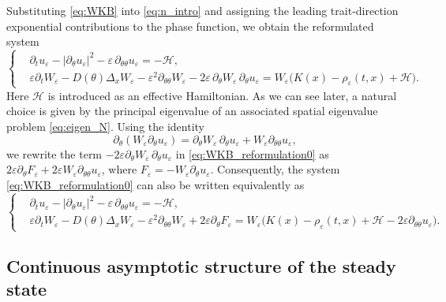 \documentclass[11pt]{article}
\begin{document}
Substituting \eqref{eq:WKB} into \eqref{eq:n_intro} and assigning the leading trait-direction exponential contributions to the phase function, we obtain the reformulated system
\begin{equation}\label{eq:WKB_reformulation0}
\left\{
\begin{aligned}
& \partial_t u_\varepsilon
- |\partial_\theta u_\varepsilon|^2
- \varepsilon \, \partial_{\theta\theta} u_\varepsilon
= - \mathcal H, \\
& \varepsilon \partial_t W_\varepsilon
- D(\theta)\Delta_x W_\varepsilon
- \varepsilon^2 \partial_{\theta\theta} W_\varepsilon
- 2\varepsilon \, \partial_\theta W_\varepsilon \, \partial_\theta u_\varepsilon
= W_\varepsilon\bigl(K(x)-\rho_\varepsilon(t,x)+\mathcal H \bigr). 
\end{aligned}
\right.
\end{equation}
Here \(\mathcal H\) is introduced as an effective Hamiltonian. 
As we can see later, a natural choice is given by the principal eigenvalue of an associated spatial eigenvalue problem \eqref{eq:eigen_N}. 
Using the identity
\[
\partial_\theta(W_\varepsilon\partial_\theta u_\varepsilon)
=
\partial_\theta W_\varepsilon\,\partial_\theta u_\varepsilon
+
W_\varepsilon\partial_{\theta\theta}u_\varepsilon,
\]
we rewrite the term  $-2\varepsilon\partial_\theta W_\varepsilon\,\partial_\theta u_\varepsilon$ in \eqref{eq:WKB_reformulation0} as $2\varepsilon\partial_\theta F_\varepsilon+2\varepsilon W_\varepsilon\partial_{\theta\theta}u_\varepsilon$, where $F_\varepsilon = - W_\varepsilon\partial_\theta u_\varepsilon$. 
Consequently, the system \eqref{eq:WKB_reformulation0} can also be written equivalently as
\begin{equation}\label{eq:WKB_reformulation}
\left\{
\begin{aligned}
& \partial_t u_\varepsilon
- |\partial_\theta u_\varepsilon|^2
- \varepsilon \, \partial_{\theta\theta} u_\varepsilon
= - \mathcal H, \\
& \varepsilon \partial_t W_\varepsilon
- D(\theta)\Delta_x W_\varepsilon
- \varepsilon^2 \partial_{\theta\theta} W_\varepsilon
+2\varepsilon\partial_\theta F_\varepsilon
=
W_\varepsilon
\bigl(
K(x)-\rho_\varepsilon(t, x)
+\mathcal H
-2\varepsilon\partial_{\theta\theta}u_\varepsilon
\bigr).
\end{aligned}
\right.
\end{equation}



\subsection{Continuous asymptotic structure of the steady state}\label{subsec:continuous_asymptotic_structure}
\end{document}
